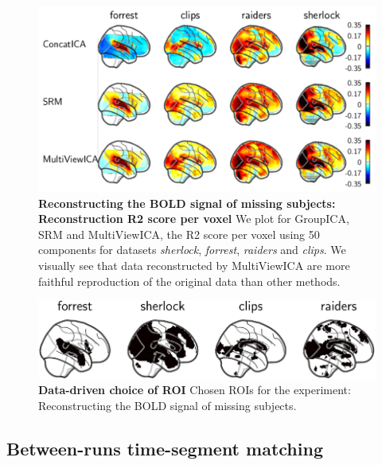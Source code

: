\documentclass[12pt]{report}
\begin{document}
\begin{figure}
  \centering
  \includegraphics[width=\textwidth]{figures/mvica/reconstruction_score_fullbrain.pdf}
  \caption{\textbf{Reconstructing the BOLD signal of missing subjects: Reconstruction R2 score per voxel} We plot for GroupICA, SRM and MultiViewICA, the R2 score per voxel using 50 components for datasets \emph{sherlock}, \emph{forrest}, \emph{raiders} and \emph{clips}. We visually see that data reconstructed by MultiViewICA are more faithful reproduction of the original data than other methods.}
  \label{fig:brainmaps}
\end{figure}

\begin{figure}
  \centering
  \includegraphics[width=\textwidth]{figures/mvica/reconstruction_score_roi.pdf}
  \caption{\textbf{Data-driven choice of ROI} Chosen ROIs for the experiment: Reconstructing the BOLD signal of missing subjects.}
  \label{fig:roi}
\end{figure}

\subsection{Between-runs time-segment matching}
\label{app_spatialmaps}
\end{document}
